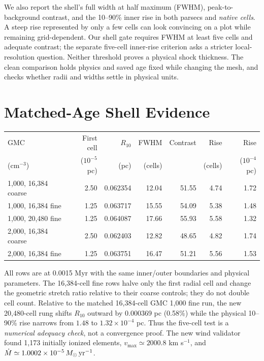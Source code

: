 \documentclass[10pt,letterpaper]{article}
\begin{document}
We also report the shell's full width at half maximum (FWHM), peak-to-background contrast, and the 10--90\% inner rise in both parsecs and \emph{native cells}. A steep rise represented by only a few cells can look convincing on a plot while remaining grid-dependent. Our shell gate requires FWHM at least five cells and adequate contrast; the separate five-cell inner-rise criterion asks a stricter local-resolution question. Neither threshold proves a physical shock thickness. The clean comparison holds physics and saved age fixed while changing the mesh, and checks whether radii and widths settle in physical units.

\clearpage
\section{Matched-Age Shell Evidence}
\begingroup\small\renewcommand{\arraystretch}{1.08}\setlength{\tabcolsep}{4pt}
\begin{tabularx}{\textwidth}{@{}lrrrrrr@{}}
\toprule
GMC & First cell & $R_{10}$ & FWHM & Contrast & Rise & Rise \\
($\mathrm{cm}^{-3}$) & ($10^{-5}$ pc) & (pc) & (cells) & & (cells) & ($10^{-4}$ pc) \\
\midrule
1,000, 16,384 coarse & 2.50 & 0.062354 & 12.04 & 51.55 & 4.74 & 1.72 \\
1,000, 16,384 fine & 1.25 & 0.063717 & 15.55 & 54.09 & 5.38 & 1.48 \\
1,000, 20,480 fine & 1.25 & 0.064087 & 17.66 & 55.93 & 5.58 & 1.32 \\
2,000, 16,384 coarse & 2.50 & 0.062403 & 12.82 & 48.65 & 4.82 & 1.74 \\
2,000, 16,384 fine & 1.25 & 0.063751 & 16.47 & 51.21 & 5.56 & 1.53 \\
\bottomrule
\end{tabularx}
\endgroup

All rows are at 0.0015 Myr with the same inner/outer boundaries and physical parameters. The 16,384-cell fine rows halve only the first radial cell and change the geometric stretch ratio relative to their coarse controls; they do not double cell count. Relative to the matched 16,384-cell GMC 1,000 fine run, the new 20,480-cell rung shifts $R_{10}$ outward by 0.000369 pc (0.58\%) while the physical 10--90\% rise narrows from $1.48$ to $1.32\times10^{-4}$ pc. Thus the five-cell test is a \emph{numerical adequacy check}, not a convergence proof. The new wind validator found 1,173 initially ionized elements, $v_{\max}\simeq2000.8$ km s$^{-1}$, and $\dot M\simeq1.0002\times10^{-5}\,M_\odot\,{\rm yr}^{-1}$.
\end{document}
